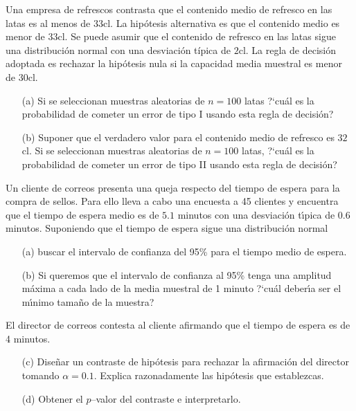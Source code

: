 \begin{prob}
    Una empresa de refrescos contrasta que el contenido medio de
    refresco en las latas es al menos de $33$cl. La hip\'{o}tesis
    alternativa es que el contenido medio es menor de $33$cl. Se puede
    asumir que el contenido de refresco en las latas sigue una
    distribuci\'{o}n normal con una desviaci\'{o}n t\'{i}pica de $2$cl.
    La regla de decisi\'{o}n adoptada es rechazar la hip\'{o}tesis nula
    si la capacidad media muestral es menor de $30$cl.
    \begin{itemize}
        \item  [(a)] Si se seleccionan muestras aleatorias de $n=100$
    latas ?`cu\'{a}l es la probabilidad de cometer un error de
    tipo I usando esta regla de decisi\'{o}n?

        \item  [(b)] Suponer que el verdadero valor para el contenido
    medio de refresco es $32$cl. Si se seleccionan muestras
    aleatorias de $n=100$ latas, ?`cu\'{a}l es la probabilidad de
    cometer un error de tipo II usando esta regla de decisi\'{o}n?
    \end{itemize}
\end{prob}

\begin{prob}
    Un cliente de correos presenta una queja respecto del tiempo de
    espera para la compra de sellos. Para ello lleva a cabo una
    encuesta a 45 clientes y encuentra que el tiempo de espera medio
    es de $5.1$ minutos con una desviaci\'{o}n t\'{\i}pica de 0.6
    minutos. Suponiendo que el tiempo de espera sigue una
    distribuci\'{o}n normal
    \begin{itemize}
        \item  [(a)] buscar el intervalo de confianza del 95\% para
    el tiempo medio de espera.

        \item  [(b)] Si queremos que el intervalo de confianza al
    95\% tenga una amplitud m\'{a}xima a cada lado de la media
    muestral de 1 minuto ?`cu\'{a}l deber\'{\i}a ser el m\'{\i}nimo
    tama\~{n}o de la muestra?
    \end{itemize}
    El director de correos contesta al cliente afirmando que el tiempo
    de espera es de 4 minutos.
    \begin{itemize}
        \item  [(c)] Dise\~{n}ar un contraste de hip\'{o}tesis para
    rechazar la afirmaci\'{o}n del director tomando $\alpha=0.1$.
    Explica razonadamente las hip\'{o}tesis que establezcas.

        \item  [(d)] Obtener el $p$--valor del contraste e interpretarlo.
    \end{itemize}
\end{prob}

